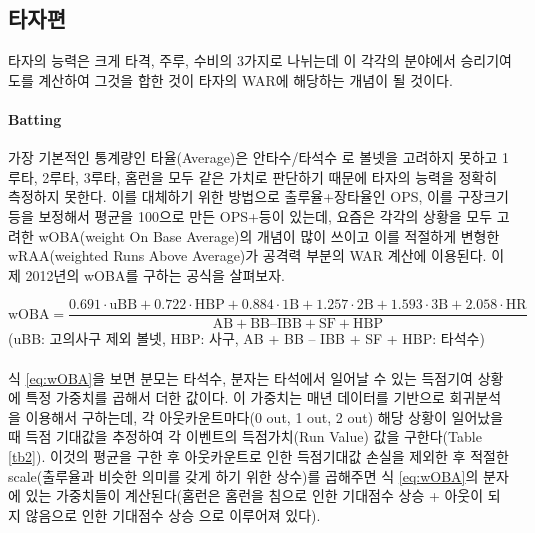 \documentclass[11pt]{article}
\begin{document}
\subsection{타자편}
타자의 능력은 크게 타격, 주루, 수비의 3가지로 나뉘는데 이 각각의 분야에서 승리기여도를 계산하여 그것을 합한 것이 타자의 WAR에 해당하는 개념이 될 것이다. 
\paragraph{Batting}
가장 기본적인 통계량인 타율(Average)은 안타수/타석수 로 볼넷을 고려하지 못하고 1루타, 2루타, 3루타, 홈런을 모두 같은 가치로 판단하기 때문에 타자의 능력을 정확히 측정하지 못한다. 이를 대체하기 위한 방법으로 출루율+장타율인 OPS, 이를 구장크기 등을 보정해서 평균을 100으로 만든 OPS+등이 있는데, 요즘은 각각의 상황을 모두 고려한 wOBA(weight On Base Average)의 개념이 많이 쓰이고 이를 적절하게 변형한 wRAA(weighted Runs Above Average)가 공격력 부분의 WAR 계산에 이용된다. 이제 2012년의 wOBA를 구하는 공식을 살펴보자.

\begin{equation}
\label{eq:wOBA}
\text{wOBA}=\frac{0.691\cdot \text{uBB} + 0.722 \cdot \text{HBP} + 0.884 \cdot \text{1B} + 1.257 \cdot \text{2B} + 1.593 \cdot \text{3B} +
2.058 \cdot \text{HR}} {\text{AB} + \text{BB} – \text{IBB} + \text{SF} + \text{HBP}}
\end{equation}
(uBB: 고의사구 제외 볼넷, HBP: 사구, AB + BB – IBB + SF + HBP: 타석수)\\\\

식 \ref{eq:wOBA}을 보면 분모는 타석수, 분자는 타석에서 일어날 수 있는 득점기여 상황에 특정 가중치를 곱해서 더한 값이다. 이 가중치는 매년 데이터를 기반으로 회귀분석을 이용해서 구하는데, 각 아웃카운트마다(0 out, 1 out, 2 out) 해당 상황이 일어났을 때 득점 기대값을 추정하여 각 이벤트의 득점가치(Run Value) 값을 구한다(Table \ref{tb2}). 이것의 평균을 구한 후 아웃카운트로 인한 득점기대값 손실을 제외한 후 적절한 scale(출루율과 비슷한 의미를 갖게 하기 위한 상수)를 곱해주면 식 \ref{eq:wOBA}의 분자에 있는 가중치들이 계산된다(홈런은 홈런을 침으로 인한 기대점수 상승 + 아웃이 되지 않음으로 인한 기대점수 상승 으로 이루어져 있다). 
\end{document}
